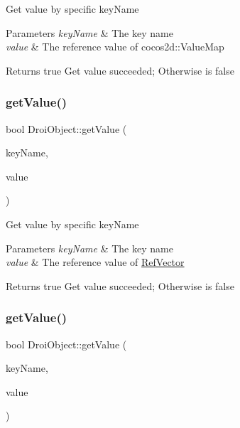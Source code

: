 Get value by specific key\+Name 
\begin{DoxyParams}{Parameters}
{\em key\+Name} & The key name \\
\hline
{\em value} & The reference value of cocos2d\+::\+Value\+Map \\
\hline
\end{DoxyParams}
\begin{DoxyReturn}{Returns}
true Get value succeeded; Otherwise is false 
\end{DoxyReturn}
\mbox{\label{class_droi_object_a3b2e0a1b0d601481c73ad0a05308cbf5}} 
\subsubsection{\texorpdfstring{get\+Value()}{getValue()}\hspace{0.1cm}{\footnotesize\ttfamily [8/11]}}
{\footnotesize\ttfamily bool Droi\+Object\+::get\+Value (\begin{DoxyParamCaption}\item[{const string \&}]{key\+Name,  }\item[{\hyperlink{class_ref_vector}{Ref\+Vector} \&}]{value }\end{DoxyParamCaption})}

Get value by specific key\+Name 
\begin{DoxyParams}{Parameters}
{\em key\+Name} & The key name \\
\hline
{\em value} & The reference value of \hyperlink{class_ref_vector}{Ref\+Vector} \\
\hline
\end{DoxyParams}
\begin{DoxyReturn}{Returns}
true Get value succeeded; Otherwise is false 
\end{DoxyReturn}
\mbox{\label{class_droi_object_ad67d6a23ccc2b90de54465cd5f487a0d}} 
\subsubsection{\texorpdfstring{get\+Value()}{getValue()}\hspace{0.1cm}{\footnotesize\ttfamily [9/11]}}
{\footnotesize\ttfamily bool Droi\+Object\+::get\+Value (\begin{DoxyParamCaption}\item[{const string \&}]{key\+Name,  }\item[{\hyperlink{class_ref_map}{Ref\+Map} \&}]{value }\end{DoxyParamCaption})}

